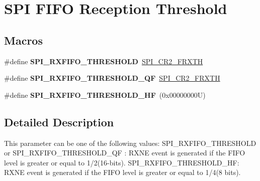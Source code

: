 \hypertarget{group___s_p_i___f_i_f_o__reception__threshold}{}\section{S\+PI F\+I\+FO Reception Threshold}
\label{group___s_p_i___f_i_f_o__reception__threshold}
\subsection*{Macros}
\begin{DoxyCompactItemize}
\item 
\mbox{\label{group___s_p_i___f_i_f_o__reception__threshold_gad59c107b3fee1ca1d6366b4b3c995c88}} 
\#define {\bfseries S\+P\+I\+\_\+\+R\+X\+F\+I\+F\+O\+\_\+\+T\+H\+R\+E\+S\+H\+O\+LD}~\hyperlink{group___peripheral___registers___bits___definition_ga6e02994914afef4270508bc3219db477}{S\+P\+I\+\_\+\+C\+R2\+\_\+\+F\+R\+X\+TH}
\item 
\mbox{\label{group___s_p_i___f_i_f_o__reception__threshold_ga89c3d57e576b7855dc34df26fd6b9972}} 
\#define {\bfseries S\+P\+I\+\_\+\+R\+X\+F\+I\+F\+O\+\_\+\+T\+H\+R\+E\+S\+H\+O\+L\+D\+\_\+\+QF}~\hyperlink{group___peripheral___registers___bits___definition_ga6e02994914afef4270508bc3219db477}{S\+P\+I\+\_\+\+C\+R2\+\_\+\+F\+R\+X\+TH}
\item 
\mbox{\label{group___s_p_i___f_i_f_o__reception__threshold_ga6e9184eadc370323383fe560209d1084}} 
\#define {\bfseries S\+P\+I\+\_\+\+R\+X\+F\+I\+F\+O\+\_\+\+T\+H\+R\+E\+S\+H\+O\+L\+D\+\_\+\+HF}~(0x00000000\+U)
\end{DoxyCompactItemize}


\subsection{Detailed Description}
This parameter can be one of the following values\+: S\+P\+I\+\_\+\+R\+X\+F\+I\+F\+O\+\_\+\+T\+H\+R\+E\+S\+H\+O\+LD or S\+P\+I\+\_\+\+R\+X\+F\+I\+F\+O\+\_\+\+T\+H\+R\+E\+S\+H\+O\+L\+D\+\_\+\+QF \+: R\+X\+NE event is generated if the F\+I\+FO level is greater or equal to 1/2(16-\/bits). S\+P\+I\+\_\+\+R\+X\+F\+I\+F\+O\+\_\+\+T\+H\+R\+E\+S\+H\+O\+L\+D\+\_\+\+HF\+: R\+X\+NE event is generated if the F\+I\+FO level is greater or equal to 1/4(8 bits). 